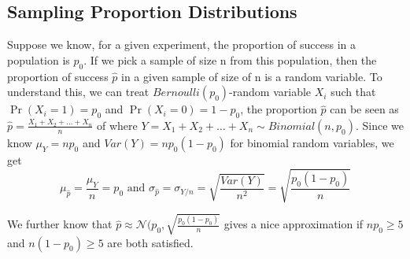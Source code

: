 \documentclass{ximera}
\begin{document}
\subsection*{Sampling Proportion Distributions}
Suppose we know, for a given experiment, the proportion of success in a population is $p_0$. If we pick a sample of size n from this population, then the proportion of success $\hat p$ in a given sample of size of  n is a random variable. To understand this, we can treat $Bernoulli(p_0)$-random variable $X_i$ such that $\Pr(X_i=1)=p_0$ and $\Pr(X_i=0)=1-p_0$, the proportion $\hat p$ can be seen as $\hat p=\frac{X_1+X_2+\ldots+X_n}{n}$ of where $Y=X_1+X_2+\ldots+X_n\sim Binomial(n,p_0)$.  Since we know $\mu_Y=np_0$ and $Var(Y)=np_0(1-p_0)$ for binomial random variables, we get 
$$\mu_{\hat p}=\frac{\mu_Y}{n}=p_0 \mbox{ and } \sigma_{\hat p}=\sigma_{Y/n}=\sqrt{\frac{Var(Y)}{n^2}}=\sqrt{\frac{p_0(1-p_0)}{n}}$$

We further know that $\hat p\approx \mathcal N(p_0,\sqrt{\frac{p_0(1-p_0)}{n}}$ gives a nice approximation if $np_0\geq 5$ and $n(1-p_0)\geq 5$ are both satisfied. 
\end{document}
